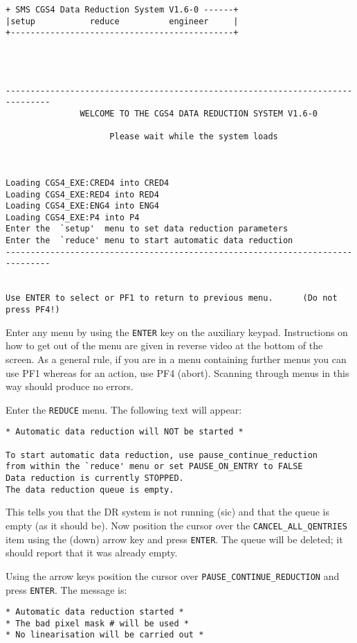 \begin{verbatim}
+ SMS CGS4 Data Reduction System V1.6-0 ------+
|setup           reduce          engineer     |
+---------------------------------------------+




-------------------------------------------------------------------------------
               WELCOME TO THE CGS4 DATA REDUCTION SYSTEM V1.6-0

                     Please wait while the system loads



Loading CGS4_EXE:CRED4 into CRED4
Loading CGS4_EXE:RED4 into RED4
Loading CGS4_EXE:ENG4 into ENG4
Loading CGS4_EXE:P4 into P4
Enter the  `setup'  menu to set data reduction parameters
Enter the  `reduce' menu to start automatic data reduction
-------------------------------------------------------------------------------


Use ENTER to select or PF1 to return to previous menu.      (Do not press PF4!)
\end{verbatim}

Enter any menu by using the {\tt ENTER} key on the auxiliary keypad.
Instructions on how to get out of the menu are given in reverse video at the
bottom of the screen. As a general rule, if you are in a menu containing
further menus you  can use PF1 whereas for an action, use PF4 (abort). Scanning
through menus in  this way should produce no errors.

Enter the {\tt REDUCE} menu. The following text will appear:

\begin{verbatim}
* Automatic data reduction will NOT be started *

To start automatic data reduction, use pause_continue_reduction
from within the `reduce' menu or set PAUSE_ON_ENTRY to FALSE
Data reduction is currently STOPPED.
The data reduction queue is empty.
\end{verbatim}

This tells you that the DR system is not running (sic) and that the queue is
empty (as it should be). Now position the cursor over the
{\tt CANCEL\_ALL\_QENTRIES} item using the (down) arrow
key and press {\tt ENTER}. The queue will be deleted; it should report that it
was already empty.

Using the arrow keys position the cursor over {\tt PAUSE\_CONTINUE\_REDUCTION}
and press {\tt ENTER}. The message is:

\begin{verbatim}
* Automatic data reduction started *
* The bad pixel mask # will be used *
* No linearisation will be carried out *
\end{verbatim}

